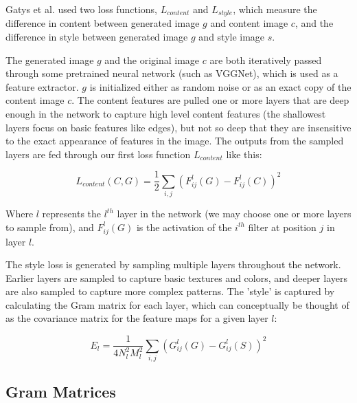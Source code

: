 \documentclass[12pt]{article}
\begin{document}
Gatys et al. used two loss functions, \(L_{content}\) and \(L_{style}\), which measure the difference in content between generated image \(g\) and content image \(c\), and the difference in style between generated image \(g\) and style image \(s\).

The generated image \(g\) and the original image \(c\) are both iteratively passed through some pretrained neural network (such as VGGNet), which is used as a feature extractor. \(g\) is initialized either as random noise or as an exact copy of the content image \(c\). The content features are pulled one or more layers that are deep enough in the network to capture high level content features (the shallowest layers focus on basic features like edges), but not so deep that they are insensitive to the exact appearance of features in the image. The outputs from the sampled layers are fed through our first loss function \(L_{content}\) like this:

\begin{equation}
    L_{content}(C, G) = \frac{1}{2} \sum_{i, j} \left( F^l_{ij}(G) - F^l_{ij}(C) \right)^2
\end{equation}

Where \(l\) represents the \(l^{th}\) layer in the network (we may choose one or more layers to sample from), and \(F^l_{ij}(G)\) is the activation of the \(i^{th}\) filter at position \(j\) in layer \(l\).

The style loss is generated by sampling multiple layers throughout the network. Earlier layers are sampled to capture basic textures and colors, and deeper layers are also sampled to capture more complex patterns. The 'style' is captured by calculating the Gram matrix for each layer, which can conceptually be thought of as the covariance matrix for the feature maps for a given layer \(l\):

\begin{equation}
    E_l = \frac{1}{4N_l^2M_l^2} \sum_{i, j} \left( G^l_{ij}(G) - G^l_{ij}(S) \right)^2
\end{equation}

\subsection{Gram Matrices}
\end{document}
